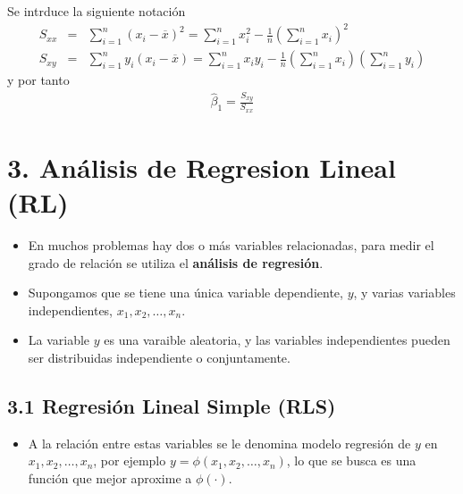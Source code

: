 Se intrduce la siguiente notaci\'on
\begin{eqnarray}
S_{xx}&=&\sum_{i=1}^{n}\left(x_{i}-\overline{x}\right)^{2}=\sum_{i=1}^{n}x_{i}^{2}-\frac{1}{n}\left(\sum_{i=1}^{n}x_{i}\right)^{2}\\
S_{xy}&=&\sum_{i=1}^{n}y_{i}\left(x_{i}-\overline{x}\right)=\sum_{i=1}^{n}x_{i}y_{i}-\frac{1}{n}\left(\sum_{i=1}^{n}x_{i}\right)\left(\sum_{i=1}^{n}y_{i}\right)
\end{eqnarray}
y por tanto
\begin{eqnarray}
\hat{\beta}_{1}=\frac{S_{xy}}{S_{xx}}
\end{eqnarray}




\section{3. An\'alisis de Regresion Lineal (RL)}




\begin{Note}
\begin{itemize}
\item En muchos problemas hay dos o m\'as variables relacionadas, para medir el grado de relaci\'on se utiliza el \textbf{an\'alisis de regresi\'on}. 
\item Supongamos que se tiene una \'unica variable dependiente, $y$, y varias  variables independientes, $x_{1},x_{2},\ldots,x_{n}$.

\item  La variable $y$ es una varaible aleatoria, y las variables independientes pueden ser distribuidas independiente o conjuntamente. 

\end{itemize}

\end{Note}




\subsection{3.1 Regresi\'on Lineal Simple (RLS)}





\begin{itemize}

\item A la relaci\'on entre estas variables se le denomina modelo regresi\'on de $y$ en $x_{1},x_{2},\ldots,x_{n}$, por ejemplo $y=\phi\left(x_{1},x_{2},\ldots,x_{n}\right)$, lo que se busca es una funci\'on que mejor aproxime a $\phi\left(\cdot\right)$.

\end{itemize}

